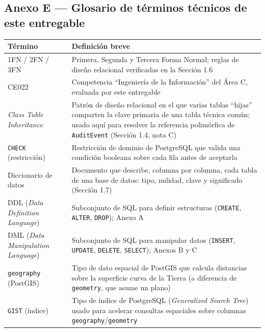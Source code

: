 \documentclass[11pt,a4paper]{article}
\begin{document}
\subsection{Anexo E --- Glosario de términos técnicos de este entregable}\label{anexo-e-glosario-de-tuxe9rminos-tuxe9cnicos-de-este-entregable}

{\small
\begin{longtable}[]{@{}
  >{\raggedright\arraybackslash}p{}
  >{\raggedright\arraybackslash}p{}@{}}
\toprule\noalign{}
\begin{minipage}[b]{\linewidth}\raggedright
Término
\end{minipage} & \begin{minipage}[b]{\linewidth}\raggedright
Definición breve
\end{minipage} \\
\midrule\noalign{}
\endhead
\bottomrule\noalign{}
\endlastfoot
1FN / 2FN / 3FN & Primera, Segunda y Tercera Forma Normal; reglas de diseño relacional verificadas en la Sección 1.6 \\
CE022 & Competencia ``Ingeniería de la Información'' del Área C, evaluada por este entregable \\
\emph{Class Table Inheritance} & Patrón de diseño relacional en el que varias tablas ``hijas'' comparten la clave primaria de una tabla técnica común; usado aquí para resolver la referencia polimórfica de \texttt{AuditEvent} (Sección 1.4, nota C) \\
\texttt{CHECK} (restricción) & Restricción de dominio de PostgreSQL que valida una condición booleana sobre cada fila antes de aceptarla \\
Diccionario de datos & Documento que describe, columna por columna, cada tabla de una base de datos: tipo, nulidad, clave y significado (Sección 1.7) \\
DDL (\emph{Data Definition Language}) & Subconjunto de SQL para definir estructuras (\texttt{CREATE}, \texttt{ALTER}, \texttt{DROP}); Anexo A \\
DML (\emph{Data Manipulation Language}) & Subconjunto de SQL para manipular datos (\texttt{INSERT}, \texttt{UPDATE}, \texttt{DELETE}, \texttt{SELECT}); Anexos B y C \\
\texttt{geography} (PostGIS) & Tipo de dato espacial de PostGIS que calcula distancias sobre la superficie curva de la Tierra (a diferencia de \texttt{geometry}, que asume un plano) \\
\texttt{GIST} (índice) & Tipo de índice de PostgreSQL (\emph{Generalized Search Tree}) usado para acelerar consultas espaciales sobre columnas \texttt{geography}/\texttt{geometry} \\

\end{longtable}}
\end{document}
